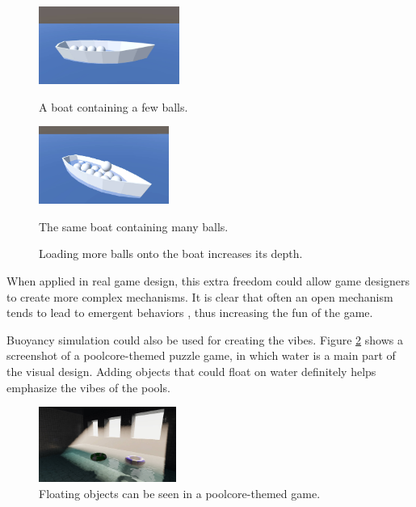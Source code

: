 \begin{figure}[htb]
	\centering
	\begin{subcaptionblock}{0.46\textwidth}
		\centering
		\includegraphics[height=1in]{figures/light-boat.jpg}
		\caption{A boat containing a few balls.}
	\end{subcaptionblock}
	\begin{subcaptionblock}{0.46\textwidth}
		\centering
		\includegraphics[height=1in]{figures/heavy-boat.jpg}
		\caption{The same boat containing many balls.}
	\end{subcaptionblock}
	\caption{Loading more balls onto the boat increases its depth.}
	\label{boat-sample}
\end{figure}

When applied in real game design, this extra freedom could allow game designers to create more complex mechanisms.
It is clear that often an open mechanism tends to lead to emergent behaviors \cite{sweetser2006emergent}, thus increasing the fun of the game.

Buoyancy simulation could also be used for creating the vibes.
Figure \ref{floating-donut-in-game} shows a screenshot of a poolcore-themed puzzle game, in which water is a main part of the visual design.
Adding objects that could float on water definitely helps emphasize the vibes of the pools.

\begin{figure}[ht]
	\centering
	\includegraphics[width=0.4\textwidth]{figures/floating-donut-in-game.jpg}
	\caption{Floating objects can be seen in a poolcore-themed game.}
	\label{floating-donut-in-game}
\end{figure}